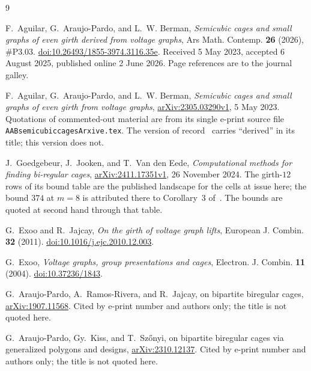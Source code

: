 \documentclass[11pt]{amsart}
\theoremstyle{remark}
\begin{document}
\begin{thebibliography}{9}

F.~Aguilar, G.~Araujo-Pardo, and L.~W. Berman,
\emph{Semicubic cages and small graphs of even girth derived from voltage
graphs},
Ars Math. Contemp. \textbf{26} (2026), \#P3.03.
\href{https://doi.org/10.26493/1855-3974.3116.35e}{doi:10.26493/1855-3974.3116.35e}.
Received 5 May 2023, accepted 6 August 2025, published online 2 June 2026.
Page references are to the journal galley.

F.~Aguilar, G.~Araujo-Pardo, and L.~W. Berman,
\emph{Semicubic cages and small graphs of even girth from voltage graphs},
\href{https://arxiv.org/abs/2305.03290}{arXiv:2305.03290v1}, 5 May 2023.
Quotations of commented-out material are from its single e-print source file
\texttt{AABsemicubiccagesArxive.tex}. The version of record~\cite{AAB} carries
``derived'' in its title; this version does not.

J.~Goedgebeur, J.~Jooken, and T.~Van den Eede,
\emph{Computational methods for finding bi-regular cages},
\href{https://arxiv.org/abs/2411.17351}{arXiv:2411.17351v1}, 26 November 2024.
The girth-$12$ rows of its bound table are the published landscape for the cells
at issue here; the bound $374$ at $m = 8$ is attributed there to Corollary~3
of~\cite{AAB}. The bounds are quoted at second hand through that table.

G.~Exoo and R.~Jajcay,
\emph{On the girth of voltage graph lifts},
European J. Combin. \textbf{32} (2011).
\href{https://doi.org/10.1016/j.ejc.2010.12.003}{doi:10.1016/j.ejc.2010.12.003}.

G.~Exoo,
\emph{Voltage graphs, group presentations and cages},
Electron. J. Combin. \textbf{11} (2004).
\href{https://doi.org/10.37236/1843}{doi:10.37236/1843}.

G.~Araujo-Pardo, A.~Ramos-Rivera, and R.~Jajcay, on bipartite biregular cages,
\href{https://arxiv.org/abs/1907.11568}{arXiv:1907.11568}. Cited by e-print
number and authors only; the title is not quoted here.

G.~Araujo-Pardo, Gy.~Kiss, and T.~Sz\H{o}nyi, on bipartite biregular cages via
generalized polygons and designs,
\href{https://arxiv.org/abs/2310.12137}{arXiv:2310.12137}. Cited by e-print
number and authors only; the title is not quoted here.

\end{thebibliography}
\end{document}
